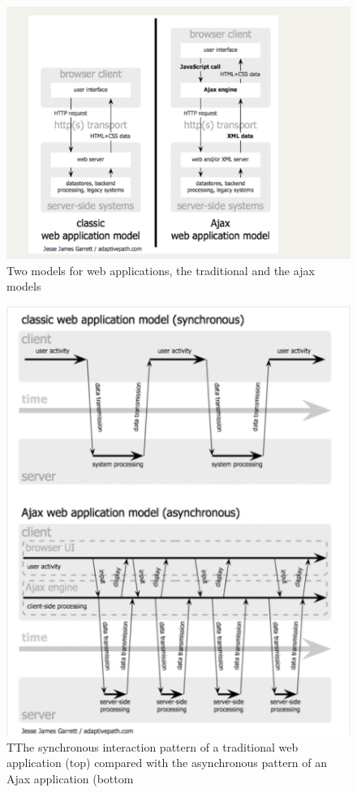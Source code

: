 \begin{figure}
  \includegraphics{Figures/web_services/traditional_vs_ajax_model}
  \caption{Two models for web applications, the traditional and the ajax models}
  \label{fig:traditional_vs_ajax_model}
\end{figure}

\begin{figure}
  \includegraphics{Figures/web_services/async_behaviour_ajax}
  \caption{TThe synchronous interaction pattern of a traditional web application
  (top) compared with the asynchronous pattern of an Ajax application (bottom}
  \label{fig:async_behaviour_ajax}
\end{figure}
